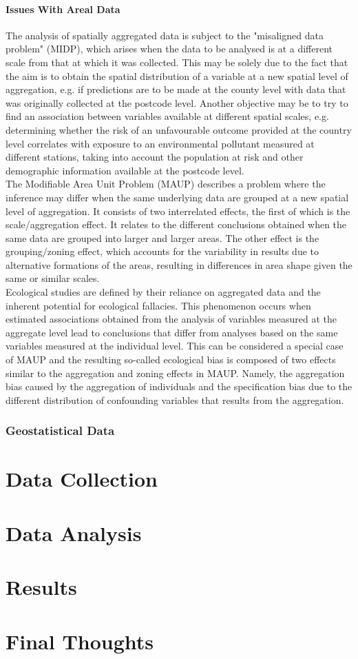 \documentclass[12pt]{book}
\begin{document}
\subsubsection{Issues With Areal Data}
The analysis of spatially aggregated data is subject to the "misaligned data problem" (MIDP), which arises when the data to be analysed is at a different scale from that at which it was collected. This may be solely due to the fact that the aim is to obtain the spatial distribution of a variable at a new spatial level of aggregation, e.g. if predictions are to be made at the county level with data that was originally collected at the postcode level. Another objective may be to try to find an association between variables available at different spatial scales, e.g. determining whether the risk of an unfavourable outcome provided at the country level correlates with exposure to an environmental pollutant measured at different stations, taking into account the population at risk and other demographic information available at the postcode level.\\
The Modifiable Area Unit Problem (MAUP) describes a problem where the inference may differ when the same underlying data are grouped at a new spatial level of aggregation. It consists of two interrelated effects, the first of which is the scale/aggregation effect. It relates to the different conclusions obtained when the same data are grouped into larger and larger areas. The other effect is the grouping/zoning effect, which accounts for the variability in results due to alternative formations of the areas, resulting in differences in area shape given the same or similar scales. \\
Ecological studies are defined by their reliance on aggregated data and the inherent potential for ecological fallacies. This phenomenon occurs when estimated associations obtained from the analysis of variables measured at the aggregate level lead to conclusions that differ from analyses based on the same variables measured at the individual level. This can be considered a special case of MAUP and the resulting so-called ecological bias is composed of two effects similar to the aggregation and zoning effects in MAUP. Namely, the aggregation bias caused by the aggregation of individuals and the specification bias due to the different distribution of confounding variables that results from the aggregation\autocite[Cf.][]{moraga2019geospatial}.
\subsection{Geostatistical Data}
\chapter{Data Collection}
\chapter{Data Analysis}
\chapter{Results}
\chapter{Final Thoughts}
\end{document}
